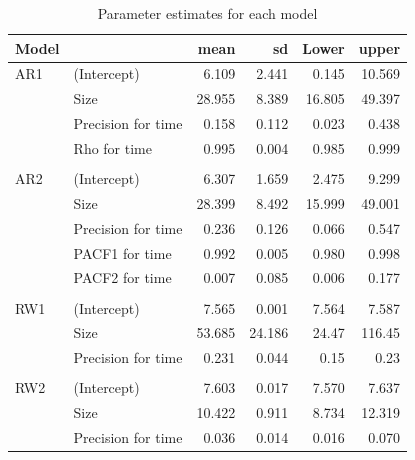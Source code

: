\documentclass[10pt,letterpaper]{article}
\begin{document}
\begin{table}[h]
	
	\caption{\label{tab:unnamed-chunk-11}Parameter estimates for each model}
	\centering
	\begin{tabular}[t]{l|l|r|r|r|r}
		\hline
		Model& & mean & sd & Lower & upper\\
		\hline
		AR1&(Intercept) & 6.109 & 2.441 & 0.145 & 10.569\\
		&Size & 28.955 & 8.389 & 16.805 & 49.397\\
		&Precision for time & 0.158 & 0.112 & 0.023 & 0.438\\
		&Rho for time & 0.995 & 0.004 & 0.985 & 0.999\\
		\hline
		& &  &  &  & \\
		AR2&(Intercept) & 6.307 & 1.659 & 2.475 & 9.299\\
		&Size & 28.399 & 8.492 & 15.999 & 49.001\\
		&Precision for time & 0.236 & 0.126 & 0.066 & 0.547\\
		&PACF1 for time & 0.992 & 0.005 & 0.980 & 0.998\\
		&PACF2 for time & 0.007 & 0.085 & 0.006 & 0.177\\
		\hline
		& &  &  &  & \\
		RW1 & (Intercept) & 7.565 & 0.001 & 7.564 & 7.587\\
		& Size & 53.685 & 24.186 & 24.47 & 116.45\\
		& Precision for time & 0.231 & 0.044 & 0.15 & 0.23\\
		\hline
		& &  &  &  & \\
		RW2 & (Intercept) & 7.603 & 0.017 & 7.570 & 7.637\\
		& Size & 10.422 & 0.911 & 8.734 & 12.319\\
		& Precision for time & 0.036 & 0.014 & 0.016 & 0.070\\
		\hline
	\end{tabular}
\end{table}
\end{document}
